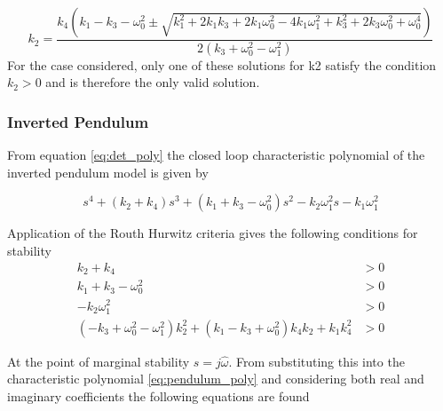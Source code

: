 \documentclass{article}
\begin{document}
\begin{equation}
  k_{2} = \frac{k_{4} \left(k_{1} - k_{3} - \omega_{0}^{2} \pm \sqrt{k_{1}^{2} + 2 k_{1} k_{3} + 2 k_{1} \omega_{0}^{2} - 4 k_{1} \omega_{1}^{2} + k_{3}^{2} + 2 k_{3} \omega_{0}^{2} + \omega_{0}^{4}}\right)}{2 \left(k_{3} + \omega_{0}^{2} - \omega_{1}^{2}\right)}
  \label{eq:predicted_crane_k2}
\end{equation}
For the case considered, only one of these solutions for k2 satisfy the condition $k_2 > 0$ and is therefore the only valid solution.

\subsubsection{Inverted Pendulum}

From equation \ref{eq:det_poly} the closed loop characteristic polynomial of the inverted pendulum model is given by

\begin{equation}
  s^{4} + \left(k_{2} + k_{4}\right) s^{3} + \left(k_{1} + k_{3} - \omega_{0}^{2}\right) s^{2} -  k_{2} \omega_{1}^{2} s -  k_{1} \omega_{1}^{2}
  \label{eq:pendulum_poly}
\end{equation}

Application of the Routh Hurwitz criteria gives the following conditions for stability
\begin{align}
  k_{2} + k_{4} &> 0 \\
  k_{1} + k_{3} - \omega_{0}^{2} &> 0 \\
  - k_{2} \omega_{1}^{2} &> 0 \\
  \left(- k_{3} + \omega_{0}^{2} - \omega_{1}^{2}\right) k_{2}^{2} + \left(k_{1} - k_{3} + \omega_{0}^{2}\right) k_{4} k_{2} + k_{1} k_{4}^{2} &> 0
\end{align}

At the point of marginal stability $s = j\hat{\omega}$.
From substituting this into the characteristic polynomial \ref{eq:pendulum_poly} and considering both real and imaginary coefficients the following equations are found
\end{document}
